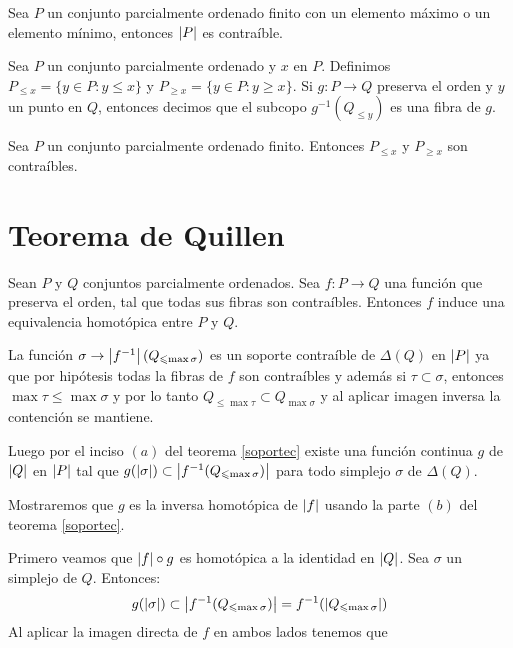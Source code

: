 \begin{Col}
Sea $P$ un conjunto parcialmente ordenado finito con un elemento máximo o un elemento mínimo, entonces $\left| P \right|$ es contraíble.
\end{Col}

\begin{Defi}
Sea $P$ un conjunto parcialmente ordenado y $x$ en $P$. Definimos
$P_{\leqslant x} = \{y\in P : y\leqslant x\}$ y $P_{\geqslant x} =
\{y\in P : y\geqslant x\}$. Si $g\colon P \rightarrow Q$ preserva el
orden y $y$ un punto en $Q$, entonces decimos que el subcopo $g^{-1}(Q_{\leqslant y})$ es una fibra de $g$.
\end{Defi}

\begin{Col}
Sea $P$ un conjunto parcialmente ordenado finito. Entonces $P_{\leqslant x}$ y $P_{\geqslant x}$ son contraíbles.
\end{Col}

\section{Teorema de Quillen}
\label{sec:teorema-de-quillen}


\begin{Teo}
Sean $P$ y $Q$ conjuntos parcialmente ordenados. Sea $f\colon P\rightarrow Q$ una función que preserva el orden, tal que todas sus fibras son contraíbles. Entonces $f$ induce una equivalencia homotópica entre $P$ y $Q$.
\end{Teo}
\begin{Dem}

La función $\sigma \rightarrow \left| f^{-1} \right|(Q_{\leqslant \max \sigma})$ es un soporte contraíble de $\Delta (Q)$ en $\left| P \right|$ ya que por hipótesis todas la fibras de $f$ son contraíbles y además si $\tau\subset \sigma$, entonces $\max \tau \leqslant\max\sigma$ y por lo tanto $Q_{\leqslant \max \tau} \subset Q_{\max \sigma}$ y al aplicar imagen inversa la contención se mantiene.

Luego por el inciso $(a)$ del teorema \ref{soportec} existe una función continua $g$ de $\left| Q \right|$ en $\left| P \right|$ tal que $g(\left| \sigma \right|)\subset \left| f^{-1}(Q_{\leqslant \max\sigma}) \right|$ para todo simplejo $\sigma$ de $\Delta(Q)$.

Mostraremos que $g$ es la inversa homotópica de $\left| f \right|$ usando la parte $(b)$ del teorema \ref{soportec}.

Primero veamos que $\left| f \right|\circ g$ es homotópica a la identidad en $\left| Q \right|$. Sea $\sigma$ un simplejo de $Q$. Entonces:
\begin{equation}
g(\left| \sigma \right|)\subset \left| f^{-1}(Q_{\leqslant \max\sigma}) \right| = f^{-1}(\left| Q_{\leqslant\max\sigma} \right|)
\end{equation}
Al aplicar la imagen directa de $f$ en ambos lados tenemos que 

\end{Dem}



